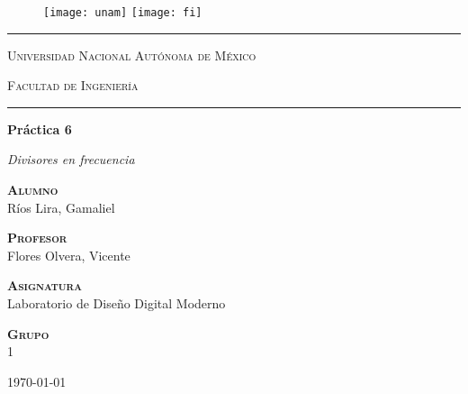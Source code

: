 \documentclass[../main.tex]{subfiles}
\begin{document}
\begin{titlepage}
  \begin{figure}[ht]
    \texttt{[image: unam]}
    \label{EscudoUNAM}
    \endminipage
    \texttt{[image: fi]}
    \label{EscudoFI}
    \endminipage
  \end{figure}

  \begin{center}
    \hrule height 0.5mm
    \vspace{0.2cm}
    \LARGE
    \textsc{Universidad Nacional Autónoma de México}

    \vfill
    \LARGE
    \textsc{Facultad de Ingeniería}
    \vspace{0.4cm}
    \hrule height 0.5mm

    \vfill
    \LARGE
    \textbf{Práctica 6}\\
    \vspace{0.8cm}
    \begin{minipage}{15cm}
      \centering
      \Large
      \textit{Divisores en frecuencia}
    \end{minipage}

    \vfill
    \large
    {\scshape \bfseries Alumno}\\
    \vspace{.3cm}
    \large
    Ríos Lira, Gamaliel

    \vfill
    \large
    {\scshape \bfseries Profesor}\\
    \vspace{.3cm}
    \large
    Flores Olvera, Vicente

    \vfill
    \large
    {\scshape \bfseries Asignatura}\\
    \vspace{.3cm}
    \large
    Laboratorio de Diseño Digital Moderno

    \vfill
    \large
    {\scshape \bfseries Grupo}\\
    \vspace{.3cm}
    \large
    1

    \vfill
    \today
  \end{center}
\end{titlepage}
\end{document}
